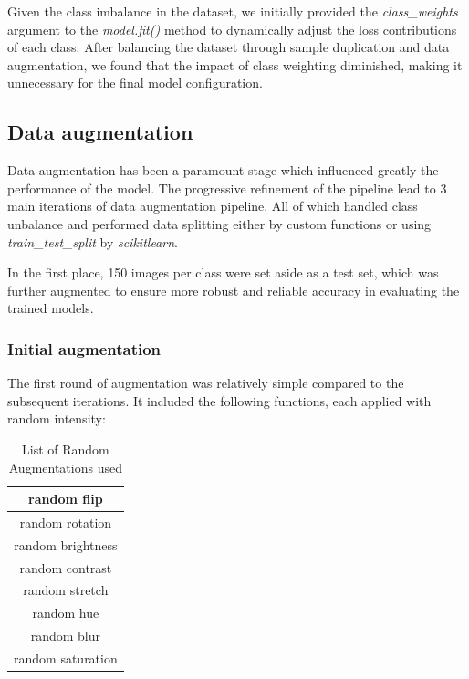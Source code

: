 \documentclass[11pt]{article}
\begin{document}
\begin{multicols}{2}
        Given the class imbalance in the dataset, we initially provided the \textit{class\_weights} argument to the \textit{model.fit()} method to dynamically adjust the loss contributions of each class. After balancing the dataset through sample duplication and data augmentation, we found that the impact of class weighting diminished, making it unnecessary for the final model configuration.
        
        \subsection{Data augmentation}
        
        Data augmentation has been a paramount stage which influenced greatly the performance of the model.
        The progressive refinement of the pipeline lead to 3 main iterations of data augmentation pipeline.
        All of which handled class unbalance and performed data splitting either by custom functions or using \textit{train\_test\_split} by \textit{scikit\-learn}.
        
        In the first place, 150 images per class were set aside as a test set, which was further augmented to ensure more robust and reliable accuracy in evaluating the trained models.
        
        \subsubsection{Initial augmentation}
        
        The first round of augmentation was relatively simple compared to the subsequent iterations.
        It included the following functions, each applied with random intensity:
        
        \begin{table}[H]
            \centering
            \setlength{\tabcolsep}{5pt}
            \caption{List of Random Augmentations used}
            \begin{tabular}{|c|}
                \hline
                random flip \\
                \hline
                random rotation \\
                \hline
                random brightness \\
                \hline
                random contrast \\
                \hline
                random stretch \\
                \hline
                random hue \\
                \hline
                random blur \\
                \hline
                random saturation \\
                \hline
            \end{tabular}
            \label{tb:RandomTransforms2}
        \end{table}
        

\end{multicols}
\end{document}
